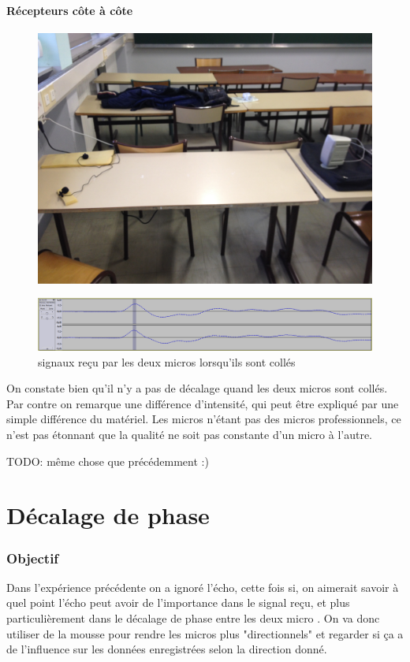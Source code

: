 \documentclass[12pt,a4paper]{report}
\begin{document}
\subsection{Récepteurs côte à côte}
\begin{figure}[H]
\includegraphics[width=\textwidth]{../donnees25-02/IMG_0920.jpg} 
\end{figure}

\begin{figure}[H]
\includegraphics[width=\textwidth]{../donnees25-02/mesures_micro_colles/colles.png} 
\caption{signaux reçu par les deux micros lorsqu'ils sont collés}
\end{figure}
On constate bien qu'il n'y a pas de décalage quand les deux micros sont collés. Par contre on remarque une différence d'intensité, qui peut être expliqué par une simple différence du matériel. Les micros n'étant pas des micros professionnels, ce n'est pas étonnant que la qualité ne soit pas constante d'un micro à l'autre.


TODO: même chose que précédemment :)


\part{Décalage de phase}
\section{Objectif}
Dans l'expérience précédente on a ignoré l'écho, cette fois si, on aimerait savoir à quel point l'écho peut avoir de l'importance dans le signal reçu, et plus particulièrement dans le décalage de phase entre les deux micro .
On va donc utiliser de la mousse pour rendre les micros plus "directionnels" et regarder si ça a de l'influence sur les données enregistrées selon la direction donné.
\end{document}
